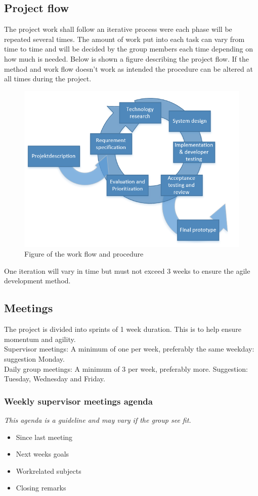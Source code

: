 \subsection{Project flow}
The project work shall follow an iterative process were each phase will be repeated several times. The amount of work put into each task can vary from time to time and will be decided by the group members each time depending on how much is needed. Below is shown a figure describing the project flow. If the method and work flow doesn't work as intended the procedure can be altered at all times during the project.
\begin{figure}[H]
\centering
\includegraphics[width=.62\textwidth]{billeder/iteration_fig.png}
\caption{Figure of the work flow and procedure}
\end{figure}
One iteration will vary in time but must not exceed 3 weeks to ensure the agile development method.\\

\subsection{Meetings}
The project is divided into sprints of 1 week duration. This is to help ensure momentum and agility.\\
Supervisor meetings: A minimum of one per week, preferably the same weekday: suggestion Monday.\\
Daily group meetings: A minimum of 3 per week, preferably more. Suggestion: Tuesday, Wednesday and Friday.

\subsubsection{Weekly supervisor meetings agenda}
\textit{This agenda is a guideline and may vary if the group see fit.}
\begin{itemize}
\item Since last meeting
\item Next weeks goals
\item Workrelated subjects
\item Closing remarks
\end{itemize}

